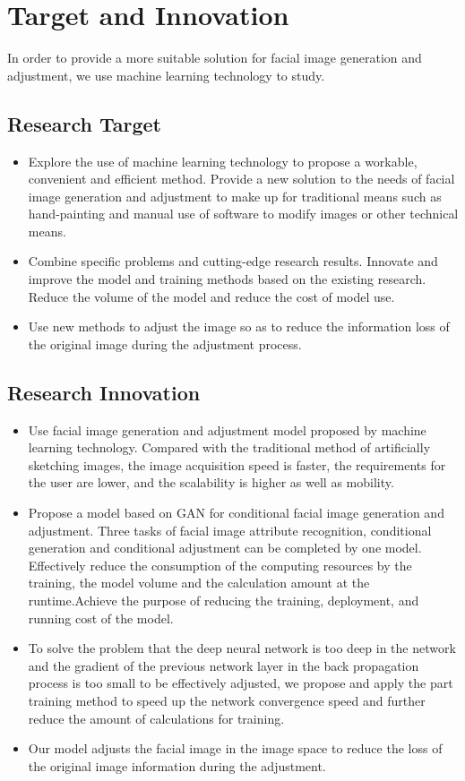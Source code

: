 \section{Target and Innovation}

In order to provide a more suitable solution for facial image generation and adjustment,
    we use machine learning technology to study.

\subsection{Research Target}
\begin{itemize}
\item Explore the use of machine learning technology to propose a workable, convenient and efficient method. Provide a new solution to the needs of facial image generation and adjustment to make up for traditional means such as hand-painting and manual use of software to modify images or other technical means. 
\item Combine specific problems and cutting-edge research results. Innovate and improve the model and training methods based on the existing research. Reduce the volume of the model and reduce the cost of model use.
\item Use new methods to adjust the image so as to reduce the information loss of the original image during the adjustment process.
\end{itemize}
\subsection{Research Innovation}
\begin{itemize}
\item Use facial image generation and adjustment model proposed by machine learning technology. Compared with the traditional method of artificially sketching images, the image acquisition speed is faster, the requirements for the user are lower, and the scalability is higher as well as mobility.
\item Propose a model based on GAN for conditional facial image generation and adjustment. Three tasks of facial image attribute recognition, conditional generation and conditional adjustment can be completed by one model. 
Effectively reduce the consumption of the computing resources by the training, the model volume and the calculation amount at the runtime.Achieve the purpose of reducing the training, deployment, and running cost of the model.
\item To solve the problem that the deep neural network is too deep in the network and the gradient of the previous network layer in the back propagation process is too small to be effectively adjusted, we propose and apply the part training method to speed up the network convergence speed and further reduce the amount of calculations for training.
\item Our model adjusts the facial image in the image space to reduce the loss of the original image information during the adjustment.
\end{itemize}